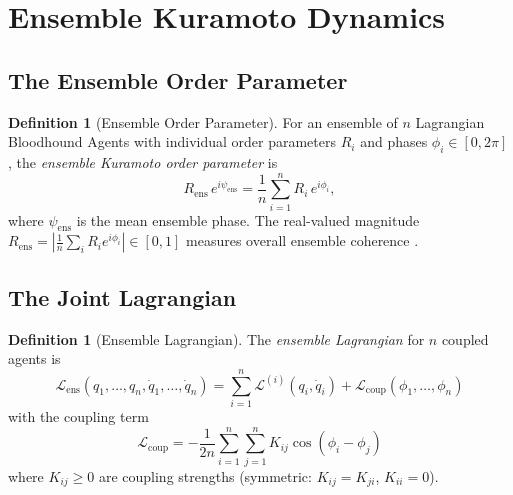 \documentclass[twocolumn,11pt,a4paper]{article}
\theoremstyle{plain}
\theoremstyle{definition}
\newtheorem{definition}[theorem]{Definition}
\theoremstyle{remark}
\newcommand{\Lop}{\mathcal{L}}
\newcommand{\abs}[1]{\left|#1\right|}
\begin{document}
\section{Ensemble Kuramoto Dynamics}
\label{sec:ensemble}

\subsection{The Ensemble Order Parameter}

\begin{definition}[Ensemble Order Parameter]
\label{def:ensemble_order}
For an ensemble of $n$ Lagrangian Bloodhound Agents with individual order parameters $R_i$ and phases $\phi_i \in [0,2\pi]$, the \emph{ensemble Kuramoto order parameter} is
\begin{equation}
  R_\mathrm{ens}\,e^{i\psi_\mathrm{ens}} = \frac{1}{n}\sum_{i=1}^n R_i\,e^{i\phi_i},
  \label{eq:ensemble_order}
\end{equation}
where $\psi_\mathrm{ens}$ is the mean ensemble phase.  The real-valued magnitude $R_\mathrm{ens} = \abs{\frac{1}{n}\sum_i R_i e^{i\phi_i}} \in [0,1]$ measures overall ensemble coherence \citep{kuramoto1984,strogatz2000,acebron2005}.
\end{definition}

\subsection{The Joint Lagrangian}
\label{sec:joint_lagrangian}

\begin{definition}[Ensemble Lagrangian]
\label{def:ensemble_lagrangian}
The \emph{ensemble Lagrangian} for $n$ coupled agents is
\begin{equation}
  \Lop_\mathrm{ens}(q_1,\ldots,q_n,\dot{q}_1,\ldots,\dot{q}_n) = \sum_{i=1}^n \Lop^{(i)}(q_i,\dot{q}_i) + \Lop_\mathrm{coup}(\phi_1,\ldots,\phi_n)
  \label{eq:ensemble_lagrangian}
\end{equation}
with the coupling term
\begin{equation}
  \Lop_\mathrm{coup} = -\frac{1}{2n}\sum_{i=1}^n\sum_{j=1}^n K_{ij}\cos(\phi_i - \phi_j)
  \label{eq:coupling}
\end{equation}
where $K_{ij} \ge 0$ are coupling strengths (symmetric: $K_{ij} = K_{ji}$, $K_{ii} = 0$).
\end{definition}
\end{document}
